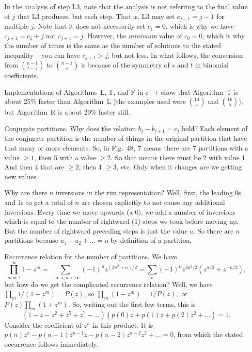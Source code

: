 \noindent In the analysis of step L3, note that the analysis is not referring to
the final value of $j$ that L3 produces, but each step.  That is, L3 may set
$c_{j+1} = j - 1$ for multiple $j$.  Note that it does not necessarily set $c_1 = 0$,
which is why we have $c_{j+1} = c_1 + j$ not $c_{j+1} = j$.  However, the {\it minimum}
value of $c_0 = 0$, which is why the number of times is the same as the number of
solutions to the stated inequality -- you can have $c_{j+1} > j$, but not less.
In what follows, the conversion from $n - 1 \choose t - 1$ to $n - 1 \choose s$
is because of the symmetry of $s$ and $t$ in binomial coefficients.

Implementations of Algorithms~L, T, and F in c++ show that Algorithm~T is about
25\% faster than Algorithm~L (the examples used were $14 \choose 4$ and $16 \choose 5$),
but Algorithm~R is about 20\% faster still.



 Conjugate partitions.  Why does the relation $b_j - b_{j+1} = c_j$
hold?  Each element of the conjugate partition is the number of things in the
original partition that have that many or more elements.  So, in Fig.~48,
7 means there are 7 partitions with a value $\geq 1$, then 5 with a value $\geq 2$.
So that means there must be 2 with value 1.  And then 4 that are $\geq 2$,
then 4 $\geq 3$, etc.  Only when it changes are we getting new values.

 Why are there $n$ inversions in the rim representation?  Well, first,
the leading 0s and 1s to get a total of $n$ are chosen explicitly to not cause
any additional inversions.  Every time we move upwards (a 0), we add a number of inversions
which is equal to the number of rightward (1) steps we took before moving up.
But the number of rightward preceding steps is just the value $a$.  So there
are $n$ partitions because $a_1 + a_2 + \ldots = n$ by definition of a partition.

\vskip 0.2in

 Recurrence relation for the number of partitions.  We have
$$
 \prod_{m=1}^{\infty} 1 - z^m = \sum_{-\infty < n < \infty} \left(-1\right)^n z^{\left(3 n^2 + n\right) / 2}
  = \sum_n \left(-1\right)^n z^{3 n^2 / 2} \left(z^{n/2} + z^{-n/2}\right),
$$
but how do we get the complicated recurrence relation?  Well, we have 
$ \prod_m 1 / \left(1 - z^m\right) = P\left(z\right)$, so $ \prod_m \left(1 - z^m\right) = 1 / P\left(z\right),$
or $P\left(z\right) \prod_m \left(1 + z^m\right).$  So, writing out the first few terms, this is
$$
 \left(1 - z - z^2 + z^5 + z^7 - \ldots \right) \left(p\left(0\right) z + p\left(1\right) z + p\left(2\right) z^2
 + \ldots\right) = 1.
$$
Consider the coefficient of $z^n$ in this product.  It is $p\left(n\right) z^n - p\left(n - 1\right) z^{n-1} z
- p\left(n - 2\right) z^{n-2} z^2 + \ldots = 0$, from which the stated occurrence follows immediately.

